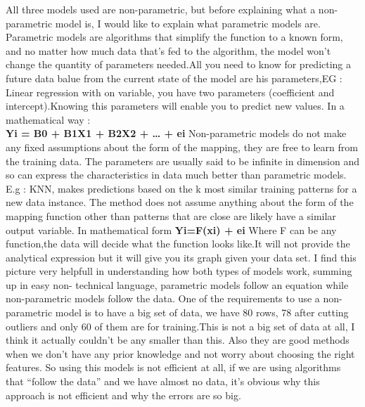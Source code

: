 \documentclass[]{article}
\begin{document}
All three models used are non-parametric, but before explaining what a
non-parametric model is, I would like to explain what parametric models
are. Parametric models are algorithms that simplify the function to a
known form, and no matter how much data that's fed to the algorithm, the
model won't change the quantity of parameters needed.All you need to
know for predicting a future data balue from the current state of the
model are his parameters,EG : Linear regression with on variable, you
have two parameters (coefficient and intercept).Knowing this parameters
will enable you to predict new values. In a mathematical way : \\
\textbf{Yi = B0 + B1X1 + B2X2 + \ldots{} + ei} Non-parametric models do
not make any fixed assumptions about the form of the mapping, they are
free to learn from the training data. The parameters are usually said to
be infinite in dimension and so can express the characteristics in data
much better than parametric models. E.g : KNN, makes predictions based
on the k most similar training patterns for a new data instance. The
method does not assume anything about the form of the mapping function
other than patterns that are close are likely have a similar output
variable. In mathematical form \textbf{Yi=F(xi) + ei} Where F can be any
function,the data will decide what the function looks like.It will not
provide the analytical expression but it will give you its graph given
your data set. I find this picture very helpfull in understanding how
both types of models work, summing up in easy non- technical language,
parametric models follow an equation while non-parametric models follow
the data. One of the requirements to use a non-parametric model is to
have a big set of data, we have 80 rows, 78 after cutting outliers and
only 60 of them are for training.This is not a big set of data at all, I
think it actually couldn't be any smaller than this. Also they are good
methods when we don't have any prior knowledge and not worry about
choosing the right features. So using this models is not efficient at
all, if we are using algorithms that ``follow the data'' and we have
almost no data, it's obvious why this approach is not efficient and why
the errors are so big.
\end{document}

